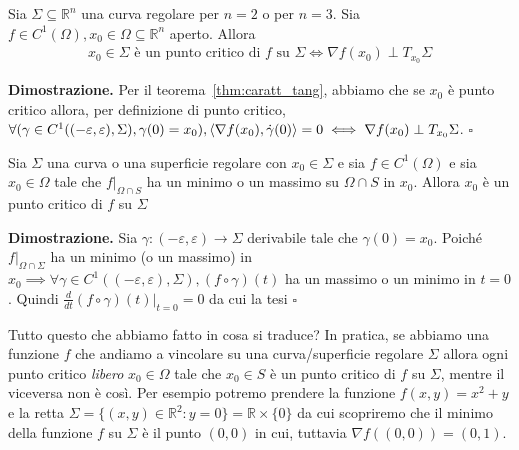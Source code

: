 \vspace{0.5cm}
\begin{theorem}[\textcolor{blue}{Dei punti critici}]
Sia $\Sigma \subseteq \mathbb{R}^n$ una curva regolare per $n=2$ o per $n=3$. Sia $f \in C^1(\Omega), x_0 \in \Omega \subseteq \mathbb{R}^n$ aperto. Allora 
\begin{align*}
x_0 \in \Sigma \text{ è un punto critico di } f \text{ su } \Sigma  \iff \nabla f(x_0) \perp T_{x_0} \Sigma
\end{align*}
\label{thm:punti_crit_su_curve}
\end{theorem}

\noindent \textbf{Dimostrazione. }
Per il teorema~\ref{thm:caratt_tang}, abbiamo che se $x_0$ è punto critico allora, per definizione di punto critico, $\forall (\gamma \in C^1((-\varepsilon, \varepsilon), \Sigma), \gamma(0)=x_0), \langle \nabla f(x_0), \dot{\gamma}(0) \rangle = 0 \iff \nabla f(x_0) \perp T_{x_0} \Sigma$.
\hfill $\square$

\begin{theorem}[\textcolor{blue}{Di Fermat su $\Sigma$}]
Sia $\Sigma$ una curva o una superficie regolare con $x_0 \in \Sigma$ e sia $f \in C^{1}(\Omega)$ e sia $x_0 \in \Omega$ tale che $f|_{\Omega \cap S}$ ha un minimo o un massimo su $\Omega \cap S$ in $x_0$. Allora $x_0$ è un punto critico di $f$ su $\Sigma$
\end{theorem}

\noindent \textbf{Dimostrazione. }
Sia $\gamma: (-\varepsilon, \varepsilon) \to \Sigma$ derivabile tale che $\gamma(0) = x_0$. Poiché $f|_{\Omega \cap \Sigma}$ ha un minimo (o un massimo) in $x_0 \implies \forall \gamma \in C^{1}((-\varepsilon, \varepsilon), \Sigma), (f \circ \gamma)(t)$ ha un massimo o un minimo in $t = 0$. Quindi $\frac{d}{dt}(f \circ \gamma)(t)|_{t=0} = 0$ da cui la tesi
\hfill $\square$

\begin{remark}
Tutto questo che abbiamo fatto in cosa si traduce? In pratica, se abbiamo una funzione $f$ che andiamo a vincolare su una curva/superficie regolare $\Sigma$ allora ogni punto critico \emph{libero} $x_0 \in \Omega$ tale che $x_0 \in S$ è un punto critico di $f$ su $\Sigma$, mentre il viceversa non è così. Per esempio potremo prendere la funzione $f(x, y) = x^2 + y$ e la retta $\Sigma = \{(x, y) \in \mathbb{R}^2 : y=0 \} = \mathbb{R} \times \{ 0 \}$ da cui scopriremo che il minimo della funzione $f$ su $\Sigma$ è il punto $(0, 0)$ in cui, tuttavia $\nabla f((0, 0)) = (0, 1)$. 
\end{remark}

